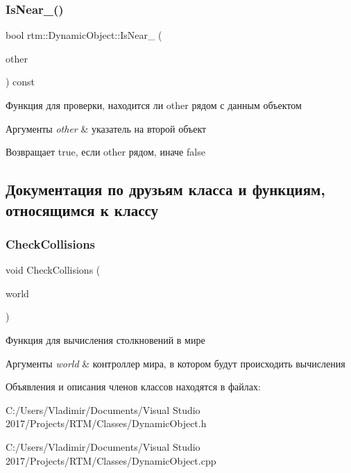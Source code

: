 \subsubsection{\texorpdfstring{Is\+Near\+\_\+()}{IsNear\_()}}
{\footnotesize\ttfamily bool rtm\+::\+Dynamic\+Object\+::\+Is\+Near\+\_\+ (\begin{DoxyParamCaption}\item[{\hyperlink{classrtm_1_1_world_object}{World\+Object} const $\ast$const}]{other }\end{DoxyParamCaption}) const\hspace{0.3cm}{\ttfamily [private]}}

Функция для проверки, находится ли other рядом с данным объектом 
\begin{DoxyParams}{Аргументы}
{\em other} & указатель на второй объект \\
\hline
\end{DoxyParams}
\begin{DoxyReturn}{Возвращает}
true, если other рядом, иначе false 
\end{DoxyReturn}


\subsection{Документация по друзьям класса и функциям, относящимся к классу}
\mbox{\label{classrtm_1_1_dynamic_object_af73a5c4922e4f77fba3e44898bfa308b}} 
\subsubsection{\texorpdfstring{Check\+Collisions}{CheckCollisions}}
{\footnotesize\ttfamily void Check\+Collisions (\begin{DoxyParamCaption}\item[{\hyperlink{classrtm_1_1_world_controller}{World\+Controller} $\ast$const}]{world }\end{DoxyParamCaption})\hspace{0.3cm}{\ttfamily [friend]}}

Функция для вычисления столкновений в мире 
\begin{DoxyParams}{Аргументы}
{\em world} & контроллер мира, в котором будут происходить вычисления \\
\hline
\end{DoxyParams}


Объявления и описания членов классов находятся в файлах\+:\begin{DoxyCompactItemize}
\item 
C\+:/\+Users/\+Vladimir/\+Documents/\+Visual Studio 2017/\+Projects/\+R\+T\+M/\+Classes/Dynamic\+Object.\+h\item 
C\+:/\+Users/\+Vladimir/\+Documents/\+Visual Studio 2017/\+Projects/\+R\+T\+M/\+Classes/Dynamic\+Object.\+cpp\end{DoxyCompactItemize}
